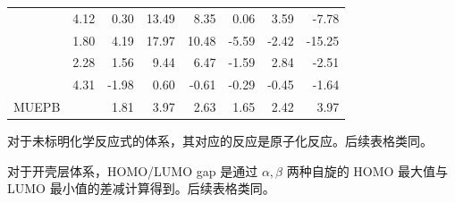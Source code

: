 \begin{table}[H]
\begin{tabular}{ld{2.2}:d{3.2}d{3.2}d{3.2}:d{3.2}d{3.2}d{3.2}}
   &  4.12  & 0.30  & 13.49 & 8.35  & 0.06      & 3.59         & -7.78       \\
   &  1.80  & 4.19  & 17.97 & 10.48 & -5.59     & -2.42        & -15.25      \\
   &  2.28  & 1.56  & 9.44  & 6.47  & -1.59     & 2.84         & -2.51       \\
   &  4.31  & -1.98 & 0.60  & -0.61 & -0.29     & -0.45        & -1.64       \\ \hline
  MUEPB                &        & 1.81  & 3.97  & 2.63  & 1.65      & 2.42         & 3.97        \\ \hline
  \end{tabular}

  \raggedright
  \par{} 对于未标明化学反应式的体系，其对应的反应是原子化反应。后续表格类同。
  \par{} 对于开壳层体系，HOMO/LUMO gap 是通过 $\alpha, \beta$ 两种自旋的 HOMO 最大值与 LUMO 最小值的差减计算得到。后续表格类同。
\end{table}

